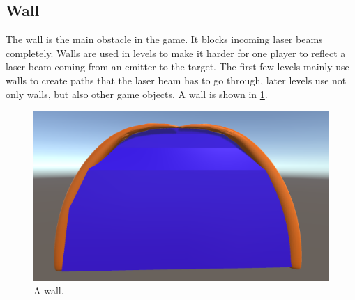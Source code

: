		\subsection{Wall} \label{ssec:wall}
			The wall is the main obstacle in the game. It blocks incoming
			laser beams completely. Walls are used in levels to make it 
			harder for one player to reflect a laser beam coming from
			an emitter to the target. The first few levels mainly use walls
			to create paths that the laser beam has to go through, later
			levels use not only walls, but also other game objects. A wall
			is shown in \ref{fig:wall}.
			\begin{figure}[!ht]
				\centering
				\includegraphics[scale = 0.15]{Wall}
				\caption{A wall.}
				\label{fig:wall}
			\end{figure}
			
